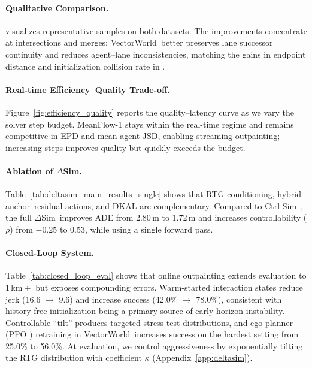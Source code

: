 \documentclass{article}
\newcommand{\VectorWorld}{VectorWorld}
\newcommand{\DeltaSim}{\(\Delta\)Sim}
\theoremstyle{plain}
\theoremstyle{definition}
\theoremstyle{remark}
\begin{document}
\paragraph{Qualitative Comparison.}
 visualizes representative samples on both datasets.
The improvements concentrate at intersections and merges: \VectorWorld\ better preserves lane successor continuity and reduces agent--lane inconsistencies, matching the gains in endpoint distance and initialization collision rate in .

\paragraph{Real-time Efficiency--Quality Trade-off.}
Figure~\ref{fig:efficiency_quality} reports the quality--latency curve as we vary the solver step budget.
MeanFlow-1 stays within the real-time regime and remains competitive in EPD and mean agent-JSD, enabling streaming outpainting; increasing steps improves quality but quickly exceeds the budget.

\paragraph{Ablation of \DeltaSim.}
Table~\ref{tab:deltasim_main_results_single} shows that RTG conditioning, hybrid anchor--residual actions, and DKAL are complementary.
Compared to Ctrl-Sim~\cite{rowe2024ctrlsim}, the full \DeltaSim\ improves ADE from 2.80\,m to 1.72\,m and increases controllability (\(\rho\)) from \(-0.25\) to 0.53, while using a single forward pass.

\paragraph{Closed-Loop System.}
Table~\ref{tab:closed_loop_eval} shows that online outpainting extends evaluation to \(1\,\mathrm{km}+\) but exposes compounding errors.
Warm-started interaction states reduce jerk (16.6 \(\to\) 9.6) and increase success (42.0\% \(\to\) 78.0\%), consistent with history-free initialization being a primary source of early-horizon instability.
Controllable ``tilt'' produces targeted stress-test distributions, and ego planner (PPO \cite{schulman2017proximal}) retraining in \VectorWorld\ increases success on the hardest setting from 25.0\% to 56.0\%. At evaluation, we control aggressiveness by exponentially tilting the RTG distribution with coefficient \(\kappa\) (Appendix~\ref{app:deltasim}).
\end{document}
